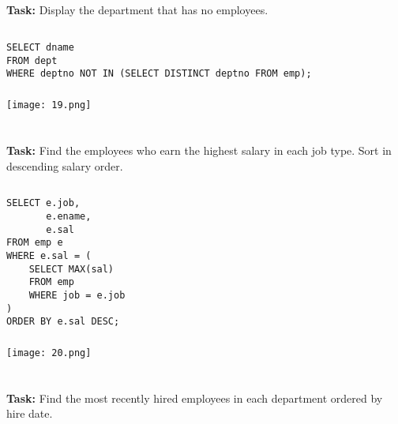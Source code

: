 \documentclass[12pt,a4paper]{article}
\begin{document}

\section{}
\textbf{Task:} Display the department that has no employees.

\subsection{}
\begin{lstlisting}
SELECT dname
FROM dept
WHERE deptno NOT IN (SELECT DISTINCT deptno FROM emp);
\end{lstlisting}

\subsubsection{}
\begin{center}
    \texttt{[image: 19.png]}
\end{center}


\section{}
\textbf{Task:} Find the employees who earn the highest salary in each job type. Sort in
descending salary order.

\subsection{}
\begin{lstlisting}
SELECT e.job,
       e.ename,
       e.sal
FROM emp e
WHERE e.sal = (
    SELECT MAX(sal)
    FROM emp
    WHERE job = e.job
)
ORDER BY e.sal DESC;
\end{lstlisting}

\subsubsection{}
\begin{center}
    \texttt{[image: 20.png]}
\end{center}


\section{}
\textbf{Task:} Find the most recently hired employees in each department ordered by
hire date.
\end{document}
